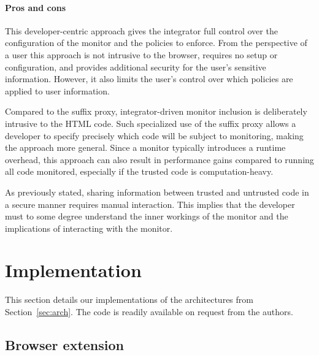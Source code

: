 \documentclass{llncs}
\newcommand{\todo}[1]{\colorbox{red}{\textcolor{white}{\sffamily\bfseries\scriptsize TODO}} \textcolor{red}{#1} \textcolor{red}{$\blacktriangleleft$}}
\begin{document}
\paragraph{Pros and cons}

This developer-centric approach gives the integrator full control over the 
configuration of the monitor and the policies to enforce. From the perspective of a user this 
approach is not intrusive to the browser, requires no setup or configuration, 
and provides additional security for the user's sensitive information. However, 
it also limits the user's control over which policies are applied to user information. 

Compared to the suffix proxy, integrator-driven monitor 
inclusion is deliberately intrusive to the HTML code. Such specialized use of the suffix 
proxy allows a developer to specify precisely which code will be subject to 
monitoring, making the approach more general. 
Since a monitor typically introduces a runtime overhead, this approach can also 
result in performance gains compared to running all code monitored, especially 
if the trusted code is computation-heavy.

As previously stated, sharing information 
between trusted and untrusted code in a secure manner requires manual interaction. 
This implies that the developer must to some degree understand the inner workings of the monitor
and the implications of interacting with the monitor.


\section{Implementation}
\label{sec:impl}

This section details our implementations of the architectures
from Section~\ref{sec:arch}. The code is readily available on request
from the authors.


\subsection{Browser extension}
\end{document}
